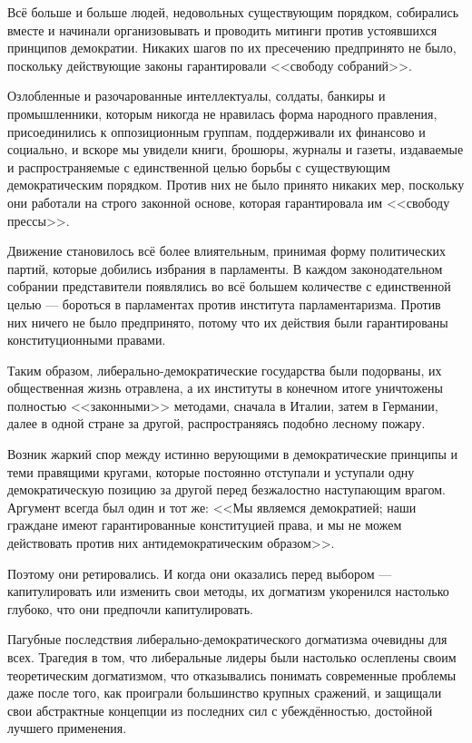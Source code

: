 Всё больше и больше людей, недовольных существующим порядком, собирались вместе и начинали организовывать и проводить митинги против устоявшихся принципов демократии. Никаких шагов по их пресечению предпринято не было, поскольку действующие законы гарантировали <<свободу собраний>>.

Озлобленные и разочарованные интеллектуалы, солдаты, банкиры и промышленники, которым никогда не нравилась форма народного правления, присоединились к оппозиционным группам, поддерживали их финансово и социально, и вскоре мы увидели книги, брошюры, журналы и газеты, издаваемые и распространяемые с единственной целью борьбы с существующим демократическим порядком. Против них не было принято никаких мер, поскольку они работали на строго законной основе, которая гарантировала им <<свободу прессы>>.

Движение становилось всё более влиятельным, принимая форму политических партий, которые добились избрания в парламенты. В каждом законодательном собрании представители появлялись во всё большем количестве с единственной целью — бороться в парламентах против института парламентаризма. Против них ничего не было предпринято, потому что их действия были гарантированы конституционными правами.

Таким образом, либерально-демократические государства были подорваны, их общественная жизнь отравлена, а их институты в конечном итоге уничтожены полностью <<законными>> методами, сначала в Италии, затем в Германии, далее в одной стране за другой, распространяясь подобно лесному пожару.

Возник жаркий спор между истинно верующими в демократические принципы и теми правящими кругами, которые постоянно отступали и уступали одну демократическую позицию за другой перед безжалостно наступающим врагом. Аргумент всегда был один и тот же: <<Мы являемся демократией; наши граждане имеют гарантированные конституцией права, и мы не можем действовать против них антидемократическим образом>>.

Поэтому они ретировались. И когда они оказались перед выбором — капитулировать или изменить свои методы, их догматизм укоренился настолько глубоко, что они предпочли капитулировать.

\sloppy Пагубные последствия либерально-демократического догматизма очевидны для всех. Трагедия в том, что либеральные лидеры были настолько ослеплены своим теоретическим догматизмом, что отказывались понимать современные проблемы даже после того, как проиграли большинство крупных сражений, и защищали свои абстрактные концепции из последних сил с убеждённостью, достойной лучшего применения.

